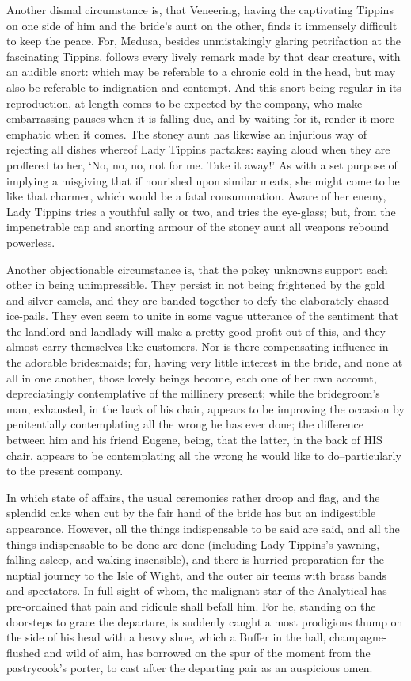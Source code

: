 Another dismal circumstance is, that Veneering, having the captivating
Tippins on one side of him and the bride’s aunt on the other, finds
it immensely difficult to keep the peace. For, Medusa, besides
unmistakingly glaring petrifaction at the fascinating Tippins, follows
every lively remark made by that dear creature, with an audible snort:
which may be referable to a chronic cold in the head, but may also be
referable to indignation and contempt. And this snort being regular in
its reproduction, at length comes to be expected by the company, who
make embarrassing pauses when it is falling due, and by waiting for it,
render it more emphatic when it comes. The stoney aunt has likewise an
injurious way of rejecting all dishes whereof Lady Tippins partakes:
saying aloud when they are proffered to her, ‘No, no, no, not for me.
Take it away!’ As with a set purpose of implying a misgiving that if
nourished upon similar meats, she might come to be like that charmer,
which would be a fatal consummation. Aware of her enemy, Lady Tippins
tries a youthful sally or two, and tries the eye-glass; but, from the
impenetrable cap and snorting armour of the stoney aunt all weapons
rebound powerless.

Another objectionable circumstance is, that the pokey unknowns support
each other in being unimpressible. They persist in not being frightened
by the gold and silver camels, and they are banded together to defy
the elaborately chased ice-pails. They even seem to unite in some vague
utterance of the sentiment that the landlord and landlady will make a
pretty good profit out of this, and they almost carry themselves
like customers. Nor is there compensating influence in the adorable
bridesmaids; for, having very little interest in the bride, and none
at all in one another, those lovely beings become, each one of her own
account, depreciatingly contemplative of the millinery present; while
the bridegroom’s man, exhausted, in the back of his chair, appears to be
improving the occasion by penitentially contemplating all the wrong he
has ever done; the difference between him and his friend Eugene, being,
that the latter, in the back of HIS chair, appears to be contemplating
all the wrong he would like to do--particularly to the present company.

In which state of affairs, the usual ceremonies rather droop and flag,
and the splendid cake when cut by the fair hand of the bride has but
an indigestible appearance. However, all the things indispensable to
be said are said, and all the things indispensable to be done are
done (including Lady Tippins’s yawning, falling asleep, and waking
insensible), and there is hurried preparation for the nuptial journey
to the Isle of Wight, and the outer air teems with brass bands and
spectators. In full sight of whom, the malignant star of the Analytical
has pre-ordained that pain and ridicule shall befall him. For he,
standing on the doorsteps to grace the departure, is suddenly caught a
most prodigious thump on the side of his head with a heavy shoe, which
a Buffer in the hall, champagne-flushed and wild of aim, has borrowed on
the spur of the moment from the pastrycook’s porter, to cast after the
departing pair as an auspicious omen.

